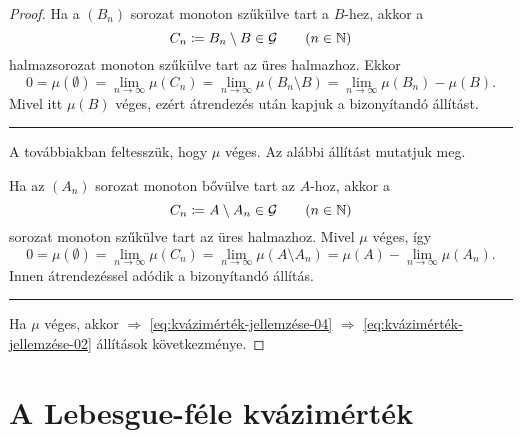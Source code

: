 \documentclass[
]{elteikthesis}[2024/04/26]
\begin{document}
\begin{proof}
		\fbox{\ref{eq:kvázimérték-jellemzése-04} \( \Longrightarrow \)
			  \ref{eq:kvázimérték-jellemzése-03}}
		Ha a \( (B_n) \) sorozat monoton szűkülve tart a \( B \)-hez, akkor a
		\[
			C_n \coloneq B_n \setminus B \in \mathcal{G} \qquad (n \in \mathbb{N})
		\]
		halmazsorozat monoton szűkülve tart az üres halmazhoz.
		Ekkor
		\[
			0 = 
			\mu( \emptyset ) =
			\lim_{n \to \infty} \mu( C_n ) =
			\lim_{n \to \infty} \mu( B_n \setminus B ) =
			\lim_{n \to \infty} \mu( B_n ) - \mu(B).
		\]
		Mivel itt \( \mu(B) \) véges, ezért átrendezés után kapjuk a bizonyítandó állítást.
		
		\vspace{9pt}
		\hrule
		\vspace{9pt}
		
		A továbbiakban feltesszük, hogy \( \mu \) véges. Az alábbi állítást mutatjuk meg.
		
		\vspace{3pt}
		
		\fbox{\ref{eq:kvázimérték-jellemzése-04} \( \Longrightarrow \)
			  \ref{eq:kvázimérték-jellemzése-02}}
		Ha az \( (A_n) \) sorozat monoton bővülve tart az \( A \)-hoz, akkor a
		\[
			C_n \coloneq A \setminus A_n \in \mathcal{G} \qquad (n \in \mathbb{N})
		\]
		sorozat monoton szűkülve tart az üres halmazhoz.
		Mivel \( \mu \) véges, így
		\[
			0 = 
			\mu( \emptyset ) =
			\lim_{n \to \infty} \mu( C_n ) =
			\lim_{n \to \infty} \mu( A \setminus A_n ) =
			\mu( A ) - \lim_{n \to \infty} \mu( A_n ).
		\]
		Innen átrendezéssel adódik a bizonyítandó állítás.
		
		\vspace{9pt}
		\hrule
		\vspace{9pt}
		
		\fbox{\ref{eq:kvázimérték-jellemzése-03} \( \Longrightarrow \)
			  \ref{eq:kvázimérték-jellemzése-02}}
		Ha \( \mu \) véges, akkor
		 \( \Longrightarrow \)
		 \ref{eq:kvázimérték-jellemzése-04} \( \Longrightarrow \)
		 \ref{eq:kvázimérték-jellemzése-02}
		állítások következménye.
		
	\end{proof}
	
	\newpage
	\section{A Lebesgue-féle kvázimérték}
	
\end{document}

